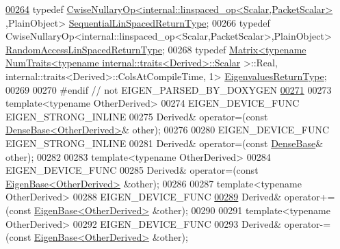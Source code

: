 \begin{DoxyCode}
\hyperlink{group___core___module_a6cdf27f6b825097f86fc6bcdbeed9e65}{00264}     \textcolor{keyword}{typedef} \hyperlink{group___core___module_class_eigen_1_1_cwise_nullary_op}{CwiseNullaryOp<internal::linspaced\_op<Scalar,PacketScalar>}
      ,PlainObject> \hyperlink{group___core___module_class_eigen_1_1_cwise_nullary_op}{SequentialLinSpacedReturnType};
00266     \textcolor{keyword}{typedef} CwiseNullaryOp<internal::linspaced\_op<Scalar,PacketScalar>,PlainObject> 
      \hyperlink{group___core___module_class_eigen_1_1_cwise_nullary_op}{RandomAccessLinSpacedReturnType};
00268     \textcolor{keyword}{typedef} \hyperlink{group___core___module_class_eigen_1_1_matrix}{Matrix<typename NumTraits<typename internal::traits<Derived>::Scalar}
      >::Real, internal::traits<Derived>::ColsAtCompileTime, 1> \hyperlink{group___core___module_class_eigen_1_1_matrix}{EigenvaluesReturnType};
00269 
00270 \textcolor{preprocessor}{#endif // not EIGEN\_PARSED\_BY\_DOXYGEN}
\hyperlink{group___core___module_a805284f5f60a6deefb5b1892d02b0f9e}{00271} 
00273     \textcolor{keyword}{template}<\textcolor{keyword}{typename} OtherDerived>
00274     EIGEN\_DEVICE\_FUNC EIGEN\_STRONG\_INLINE
00275     Derived& operator=(\textcolor{keyword}{const} \hyperlink{group___core___module_class_eigen_1_1_dense_base}{DenseBase<OtherDerived>}& other);
00276 
00280     EIGEN\_DEVICE\_FUNC EIGEN\_STRONG\_INLINE
00281     Derived& operator=(\textcolor{keyword}{const} \hyperlink{group___core___module_class_eigen_1_1_dense_base}{DenseBase}& other);
00282 
00283     \textcolor{keyword}{template}<\textcolor{keyword}{typename} OtherDerived>
00284     EIGEN\_DEVICE\_FUNC
00285     Derived& operator=(\textcolor{keyword}{const} \hyperlink{group___core___module_struct_eigen_1_1_eigen_base}{EigenBase<OtherDerived>} &other);
00286 
00287     \textcolor{keyword}{template}<\textcolor{keyword}{typename} OtherDerived>
00288     EIGEN\_DEVICE\_FUNC
\hyperlink{group___core___module_a0ec93fbbf57f19fd6253fe1bef9a960c}{00289}     Derived& operator+=(\textcolor{keyword}{const} \hyperlink{group___core___module_struct_eigen_1_1_eigen_base}{EigenBase<OtherDerived>} &other);
00290 
00291     \textcolor{keyword}{template}<\textcolor{keyword}{typename} OtherDerived>
00292     EIGEN\_DEVICE\_FUNC
00293     Derived& operator-=(\textcolor{keyword}{const} \hyperlink{group___core___module_struct_eigen_1_1_eigen_base}{EigenBase<OtherDerived>} &other);

\end{DoxyCode}

